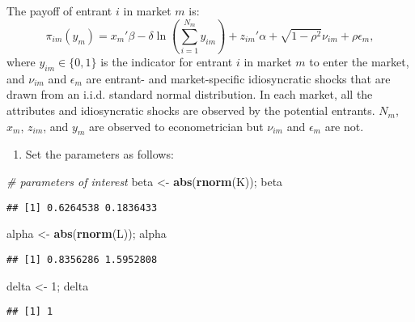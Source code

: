 \documentclass[
]{book}
\newenvironment{Shaded}{\begin{snugshade}}{\end{snugshade}}
\newcommand{\CommentTok}[1]{\textcolor[rgb]{0.56,0.35,0.01}{\textit{#1}}}
\newcommand{\DecValTok}[1]{\textcolor[rgb]{0.00,0.00,0.81}{#1}}
\newcommand{\FunctionTok}[1]{\textcolor[rgb]{0.13,0.29,0.53}{\textbf{#1}}}
\newcommand{\NormalTok}[1]{#1}
\newcommand{\OtherTok}[1]{\textcolor[rgb]{0.56,0.35,0.01}{#1}}
\providecommand{\tightlist}{%
  \setlength{\itemsep}{0pt}\setlength{\parskip}{0pt}}
\begin{document}
The payoff of entrant \(i\) in market \(m\) is:
\[
\pi_{im}(y_m) = x_m'\beta - \delta \ln \left(\sum_{i = 1}^{N_m} y_{im}\right) + z_{im}'\alpha + \sqrt{1 - \rho^2} \nu_{im} + \rho \epsilon_{m},
\]
where \(y_{im} \in \{0, 1\}\) is the indicator for entrant \(i\) in market \(m\) to enter the market, and \(\nu_{im}\) and \(\epsilon_m\) are entrant- and market-specific idiosyncratic shocks that are drawn from an i.i.d. standard normal distribution. In each market, all the attributes and idiosyncratic shocks are observed by the potential entrants. \(N_m\), \(x_m\), \(z_{im}\), and \(y_m\) are observed to econometrician but \(\nu_{im}\) and \(\epsilon_m\) are not.

\begin{enumerate}
\def\labelenumi{\arabic{enumi}.}
\setcounter{enumi}{1}
\tightlist
\item
  Set the parameters as follows:
\end{enumerate}

\begin{Shaded}
\begin{Highlighting}[]
\CommentTok{\# parameters of interest}
\NormalTok{beta }\OtherTok{\textless{}{-}} \FunctionTok{abs}\NormalTok{(}\FunctionTok{rnorm}\NormalTok{(K)); }
\NormalTok{beta}
\end{Highlighting}
\end{Shaded}

\begin{verbatim}
## [1] 0.6264538 0.1836433
\end{verbatim}

\begin{Shaded}
\begin{Highlighting}[]
\NormalTok{alpha }\OtherTok{\textless{}{-}} \FunctionTok{abs}\NormalTok{(}\FunctionTok{rnorm}\NormalTok{(L)); }
\NormalTok{alpha}
\end{Highlighting}
\end{Shaded}

\begin{verbatim}
## [1] 0.8356286 1.5952808
\end{verbatim}

\begin{Shaded}
\begin{Highlighting}[]
\NormalTok{delta }\OtherTok{\textless{}{-}} \DecValTok{1}\NormalTok{; }
\NormalTok{delta}
\end{Highlighting}
\end{Shaded}

\begin{verbatim}
## [1] 1
\end{verbatim}
\end{document}
